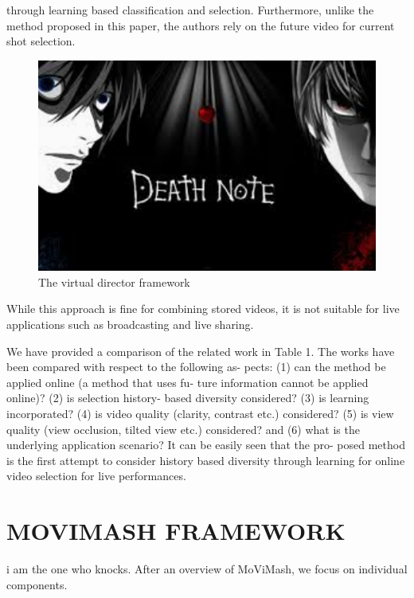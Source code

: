 \documentclass{sig-alternate-05-2015}
\begin{document}
through learning based classification and selection. Furthermore,
unlike the method proposed in this paper, the authors rely on the
future video for current shot selection. 
\begin{figure}
\centering
\includegraphics{note.pdf}
\caption{The virtual director framework}
\end{figure}
While this approach is fine for combining stored videos, it is not suitable for live applications
such as broadcasting and live sharing.\par
We have provided a comparison of the related work in Table 1.
The works have been compared with respect to the following as-
pects: (1) can the method be applied online (a method that uses fu-
ture information cannot be applied online)? (2) is selection history-
based diversity considered? (3) is learning incorporated? (4) is
video quality (clarity, contrast etc.) considered? (5) is view quality
(view occlusion, tilted view etc.) considered? and (6) what is the
underlying application scenario? It can be easily seen that the pro-
posed method is the first attempt to consider history based diversity
through learning for online video selection for live performances.

\section{MOVIMASH FRAMEWORK}
i am the one who knocks. After an overview of MoViMash, we focus on individual components.
\end{document}

